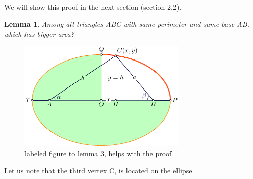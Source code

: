 \documentclass[a4paper]{book}
\newtheorem{lemma}[theorem]{Lemma}%
\numberwithin{theorem}{section}%
\begin{document}
We will show this proof in the next section (section 2.2).

\begin{lemma} 
    Among all triangles ABC with same perimeter and same base AB, which has bigger area?
\end{lemma}
\newpage
\begin{figure}[hbt!]
    \begin{center}   
        \includegraphics[width=80mm]{lemma3}
        \caption{labeled figure to lemma 3, helps with the proof}
    \end{center}
\end{figure}\leavevmode
Let us note that the third vertex $\mathrm{C}$, is located on the ellipse
\end{document}
